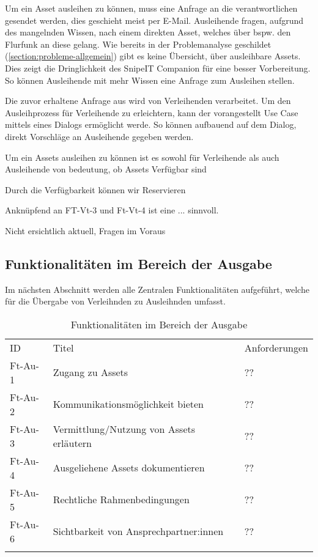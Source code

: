 \label{subsubsection:Ag-Vt-1}
Um ein Asset ausleihen zu können, muss eine Anfrage an die verantwortlichen gesendet werden, dies
geschieht meist per E-Mail. Ausleihende fragen, aufgrund des mangelnden Wissen, nach einem direkten
Asset, welches über bspw. den Flurfunk an diese gelang. Wie bereits in der Problemanalyse geschildet
(\ref{section:probleme-allgemein}) gibt es keine Übersicht, über ausleihbare Assets. Dies zeigt die
Dringlichkeit des SnipeIT Companion für eine besser Vorbereitung. So können Ausleihende mit mehr
Wissen eine Anfrage zum Ausleihen stellen. 

Die zuvor erhaltene Anfrage aus  wird von Verleihenden verarbeitet.
Um den Ausleihprozess für Verleihende zu erleichtern, kann der vorangestellt Use Case mittels eines
Dialogs ermöglicht werde. So können aufbauend auf dem Dialog, direkt Vorschläge an Ausleihende gegeben
werden.

Um ein Assets ausleihen zu können ist es sowohl für Verleihende als auch Ausleihende von bedeutung,
ob Assets Verfügbar sind

Durch die Verfügbarkeit können wir Reservieren

Anknüpfend an FT-Vt-3 und Ft-Vt-4 ist eine ... sinnvoll.

Nicht ersichtlich aktuell, Fragen im Voraus 

\subsection{Funktionalitäten im Bereich der Ausgabe}
Im nächsten Abschnitt werden alle Zentralen Funktionalitäten aufgeführt, welche für die Übergabe von
Verleihnden zu Ausleihnden umfasst.
\begin{table}[h]
    \centering
    \caption{Funktionalitäten im Bereich der Ausgabe}
    \begin{tabular}{lll}
            \arrayrulecolor{maincolor}\hline
            \sffamily\color{maincolor}ID & \sffamily\color{maincolor}Titel &
            \sffamily\color{maincolor}Anforderungen \\
            \arrayrulecolor{maincolor}\hline
            Ft-Au-1 & Zugang zu Assets                              & ?? \\
            Ft-Au-2 & Kommunikationsmöglichkeit bieten              & ?? \\
            Ft-Au-3 & Vermittlung/Nutzung von Assets erläutern      & ?? \\
            Ft-Au-4 & Ausgeliehene Assets dokumentieren             & ?? \\
            Ft-Au-5 & Rechtliche Rahmenbedingungen                  & ?? \\
            Ft-Au-6 & Sichtbarkeit von Ansprechpartner:innen        & ?? \\
            \arrayrulecolor{maincolor}\hline
    \end{tabular}
    \label{table:ft-Au}
\end{table}


